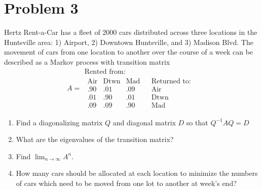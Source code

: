 \documentclass[10pt,a4paper]{article}
\theoremstyle{definition}
\begin{document}
\section*{Problem 3}
Hertz Rent-a-Car has a fleet of 2000 cars distributed across three locations in the Huntsville area: 1) Airport, 2) Downtown Huntsville, and 3) Madison Blvd. The movement of cars from one location to another over the course of a week can be described as a Markov process with transition matrix
\[A = \begin{array}{c|c}
\text{Rented from:}\\
    \begin{array}{ccc} \text{Air} &\text{Dtwn} &\text{Mad}\\\hline
    .90 &.01 &.09\\
    .01 &.90 &.01\\
    .09 &.09 &.90
    \end{array} &\begin{array}{l} \text{Returned to:}\\\hline \text{Air}\\ \text{Dtwn} \\ \text{Mad} \end{array}
\end{array}\]
\begin{enumerate}
    \item Find a diagonalizing matrix $Q$ and diagonal matrix $D$ so that $Q^{-1} A Q = D$
    \item What are the eigenvalues of the transition matrix?
    \item Find $\lim_{n \to \infty}A^n$.
    \item How many cars should be allocated at each location to minimize the numbers of cars which need to be moved from one lot to another at week's end?
    \end{enumerate}
    
\end{document}
